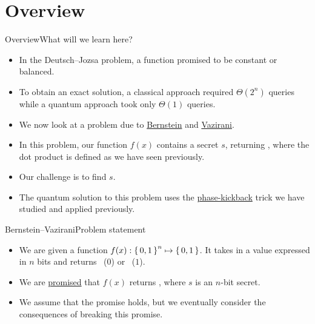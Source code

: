 
\section*{Overview}

\begin{frame}{Overview}{What will we learn here?}

\begin{itemize}
    \item In the Deutsch--Jozsa problem, a function promised to be constant or balanced.
    \item To obtain an exact solution, a classical approach required $\Theta(2^{n})$ queries while a quantum approach took only $\Theta(1)$ queries.
    \item We now look at a problem due to \href{https://en.wikipedia.org/wiki/Ethan_Bernstein}{Bernstein} and \href{https://en.wikipedia.org/wiki/Umesh_Vazirani}{Vazirani}.
    \item In this problem, our function $f(x)$ contains a secret $s$, returning , where the dot product is defined as we have seen previously.
    \item Our challenge is to find $s$.
    \item The quantum solution to this problem uses the \href{https://qiskit.org/textbook/ch-gates/phase-kickback.html}{phase-kickback} trick we have studied and applied previously.
\end{itemize}
    
\end{frame}

\begin{frame}{Bernstein--Vazirani}{Problem statement}

\begin{itemize}[<+->]
    \item We are given a function $f(x): \left\{\,0,1\,\right\}^{n}\mapsto \left\{\,0,1\,\right\}$.  It takes in a value expressed in $n$ bits and returns \False{}~($0$) or \True~($1$).
    \item We are \href{https://en.wikipedia.org/wiki/Promise_problem}{promised} that $f(x)$ returns , where $s$ is an $n$-bit secret.
    \item We assume that the promise holds, but we eventually consider the consequences of breaking this promise.
\end{itemize}
    
\end{frame}

